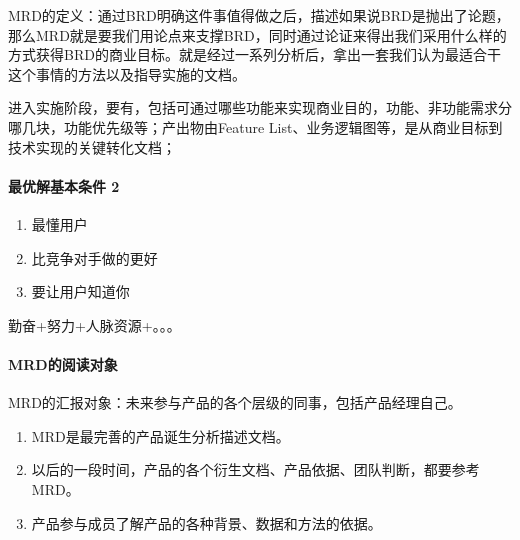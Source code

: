 \documentclass[letterpaper,11pt,english]{sphinxmanual}
\begin{document}
MRD的定义：通过BRD明确这件事值得做之后，描述如果说BRD是抛出了论题，那么MRD就是要我们用论点来支撑BRD，同时通过论证来得出我们采用什么样的方式获得BRD的商业目标。就是经过一系列分析后，拿出一套我们认为最适合干这个事情的方法以及指导实施的文档。

进入实施阶段，要有，包括可通过哪些功能来实现商业目的，功能、非功能需求分哪几块，功能优先级等；产出物由Feature
List、业务逻辑图等，是从商业目标到技术实现的关键转化文档；%
\begin{footnote}[483]\sphinxAtStartFootnote
{}
%
\end{footnote}


\paragraph{最优解基本条件 2\sphinxfootnotemark[484]}
\label{\detokenize{chapter_knowledge/MRD:id2}}%
\begin{footnotetext}[484]\sphinxAtStartFootnote
{}
%
\end{footnotetext}\ignorespaces \begin{enumerate}
%
\item {} 
最懂用户

\item {} 
比竞争对手做的更好

\item {} 
要让用户知道你

\end{enumerate}

勤奋+努力+人脉资源+。。。


\paragraph{MRD的阅读对象}
\label{\detokenize{chapter_knowledge/MRD:mrd}}
MRD的汇报对象：未来参与产品的各个层级的同事，包括产品经理自己。
\begin{enumerate}
%
\item {} 
MRD是最完善的产品诞生分析描述文档。

\item {} 
以后的一段时间，产品的各个衍生文档、产品依据、团队判断，都要参考MRD。

\item {} 
产品参与成员了解产品的各种背景、数据和方法的依据。

\end{enumerate}
\end{document}

